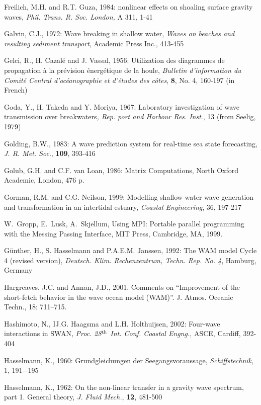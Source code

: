 \documentclass[12pt]{book}
\begin{document}
\begin{thebibliography}{10}
Freilich, M.H. and R.T. Guza, 1984: nonlinear effects on shoaling surface gravity waves, {\it Phil. Trans. R.
Soc. London, }A 311, 1-41

Galvin, C.J., 1972: Wave breaking in shallow water, {\it Waves on beaches and resulting sediment transport},
Academic Press Inc., 413-455

Gelci, R., H. Cazal\'{e} and J. Vassal, 1956: Utilization des diagrammes de propagation \`{a} la pr\'{e}vision
\'{e}nerg\'{e}tique de la houle, {\it Bulletin d'information du Comit\'{e} Central d'oc\'{e}anographie et d'\'{e}tudes
des c\^{o}tes}, {\bf 8}, No. 4, 160-197 (in French)

Goda, Y., H. Takeda and Y. Moriya, 1967: Laboratory investigation of wave transmission over breakwaters{\it ,
Rep. port and Harbour Res. Inst}., 13 (from Seelig, 1979)

Golding, B.W., 1983: A wave prediction system for real-time sea state forecasting, {\it J. R. Met. Soc}., {\bf 109},
393-416

Golub, G.H. and C.F. van Loan, 1986: Matrix Computations, North Oxford Academic, London, 476 p.

Gorman, R.M. and C.G. Neilson, 1999: Modelling shallow water wave generation and transformation in
an intertidal estuary, {\it Coastal Engineering}, 36, 197-217

W.~Gropp, E.~Lusk, A.~Skjellum, Using {MPI}: {P}ortable parallel programming
  with the {M}essing {P}assing {I}nterface, MIT Press, Cambridge, MA, 1999.

G\"{u}nther, H., S. Hasselmann and P.A.E.M. Janssen, 1992: The WAM model Cycle 4 (revised version),
{\it Deutsch. Klim. Rechenzentrum, Techn. Rep. No. 4}, Hamburg, Germany

Hargreaves, J.C. and Annan, J.D., 2001. Comments on ``{I}mprovement of the short-fetch behavior
  in the wave ocean model ({WAM})''. J. Atmos. Oceanic Techn., 18: 711--715.

Hashimoto, N., IJ.G. Haagsma and L.H. Holthuijsen, 2002: Four-wave interactions in SWAN, {\it Proc. 28$^{{\rm th}}$
Int. Conf. Coastal Engng.}, ASCE, Cardiff, 392-404

Hasselmann, K., 1960: Grundgleichungen der Seegangsvoraussage, {\it Schiffstechnik}, 1,  191$-$195

Hasselmann, K., 1962: On the non-linear transfer in a gravity wave spectrum, part 1. {G}eneral theory,
{\it J. Fluid Mech.}, {\bf 12}, 481-500


\end{thebibliography}
\end{document}
